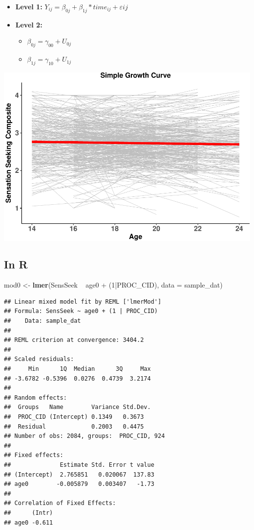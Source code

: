 \documentclass[]{article}
\newenvironment{Shaded}{\begin{snugshade}}{\end{snugshade}}
\newcommand{\KeywordTok}[1]{\textcolor[rgb]{0.13,0.29,0.53}{\textbf{{#1}}}}
\newcommand{\DataTypeTok}[1]{\textcolor[rgb]{0.13,0.29,0.53}{{#1}}}
\newcommand{\DecValTok}[1]{\textcolor[rgb]{0.00,0.00,0.81}{{#1}}}
\newcommand{\StringTok}[1]{\textcolor[rgb]{0.31,0.60,0.02}{{#1}}}
\newcommand{\NormalTok}[1]{{#1}}
\begin{document}
\begin{itemize}
  \item \textbf{Level 1:} $Y_{ij} = \beta_{0j} + \beta_{1j}*time_{ij} + \varepsilon{ij}$
  \item \textbf{Level 2:} 
    \begin{itemize} 
      \item $\beta_{0j} = \gamma_{00} + U_{0j}$
      \item $\beta_{1j} = \gamma_{10} + U_{1j}$
    \end{itemize}
\end{itemize}

\includegraphics{Conditional_Models_doc_files/figure-latex/unnamed-chunk-3-1.pdf}

\subsection{In R}\label{in-r}

\small

\begin{Shaded}
\begin{Highlighting}[]
\NormalTok{mod0 <-}\StringTok{ }\KeywordTok{lmer}\NormalTok{(SensSeek ~}\StringTok{ }\NormalTok{age0 +}\StringTok{ }\NormalTok{(}\DecValTok{1}\NormalTok{|PROC_CID), }\DataTypeTok{data =} \NormalTok{sample_dat)}
\end{Highlighting}
\end{Shaded}

\centering
\small

\begin{verbatim}
## Linear mixed model fit by REML ['lmerMod']
## Formula: SensSeek ~ age0 + (1 | PROC_CID)
##    Data: sample_dat
## 
## REML criterion at convergence: 3404.2
## 
## Scaled residuals: 
##     Min      1Q  Median      3Q     Max 
## -3.6782 -0.5396  0.0276  0.4739  3.2174 
## 
## Random effects:
##  Groups   Name        Variance Std.Dev.
##  PROC_CID (Intercept) 0.1349   0.3673  
##  Residual             0.2003   0.4475  
## Number of obs: 2084, groups:  PROC_CID, 924
## 
## Fixed effects:
##              Estimate Std. Error t value
## (Intercept)  2.765851   0.020067  137.83
## age0        -0.005879   0.003407   -1.73
## 
## Correlation of Fixed Effects:
##      (Intr)
## age0 -0.611
\end{verbatim}
\end{document}
